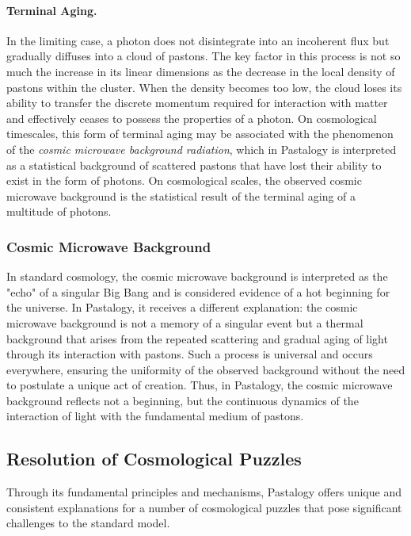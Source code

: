 \documentclass[pdflatex,sn-mathphys-num,referee]{sn-jnl}
\begin{document}
\paragraph{Terminal Aging.}
In the limiting case, a photon does not disintegrate into an incoherent flux but gradually diffuses into a cloud of pastons. The key factor in this process is not so much the increase in its linear dimensions as the decrease in the local density of pastons within the cluster. When the density becomes too low, the cloud loses its ability to transfer the discrete momentum required for interaction with matter and effectively ceases to possess the properties of a photon. On cosmological timescales, this form of terminal aging may be associated with the phenomenon of the \emph{cosmic microwave background radiation}, which in Pastalogy is interpreted as a statistical background of scattered pastons that have lost their ability to exist in the form of photons. On cosmological scales, the observed cosmic microwave background is the statistical result of the terminal aging of a multitude of photons.

\subsubsection*{Cosmic Microwave Background}\label{subsubsec:relic-radiation}
In standard cosmology, the cosmic microwave background is interpreted as the "echo" of a singular Big Bang \cite{alpher1948-bigbang, penzias1965-cmb} and is considered evidence of a hot beginning for the universe.
In Pastalogy, it receives a different explanation: the cosmic microwave background is not a memory of a singular event but a thermal background that arises from the repeated scattering and gradual aging of light through its interaction with pastons.
Such a process is universal and occurs everywhere, ensuring the uniformity of the observed background without the need to postulate a unique act of creation.
Thus, in Pastalogy, the cosmic microwave background reflects not a beginning, but the continuous dynamics of the interaction of light with the fundamental medium of pastons.

\subsection{Resolution of Cosmological Puzzles}\label{subsec:cosmological-solutions}

Through its fundamental principles and mechanisms, Pastalogy offers unique and consistent explanations for a number of cosmological puzzles that pose significant challenges to the standard model.
\end{document}
